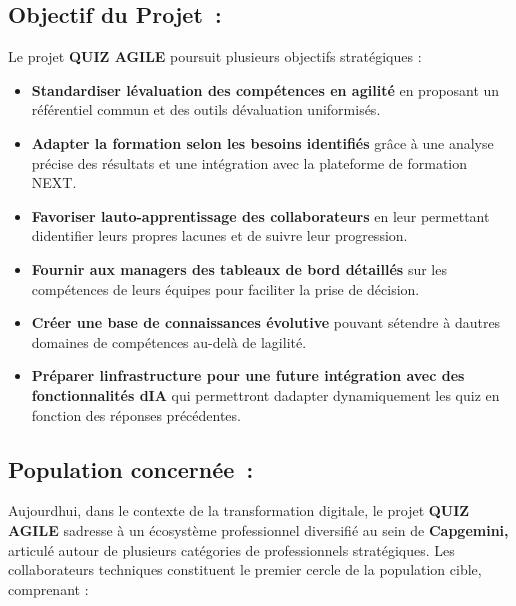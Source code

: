 \documentclass[12pt,a4paper,twoside]{report}
\begin{document}
\hypertarget{objectif-du-projet}{%
\subsection{Objectif du Projet~:~}\label{objectif-du-projet}}

Le projet \textbf{QUIZ AGILE} poursuit plusieurs objectifs stratégiques
:

\begin{itemize}
\item
  \textbf{Standardiser l\textquotesingle évaluation des compétences en
  agilité} en proposant un référentiel commun et des outils
  d\textquotesingle évaluation uniformisés.
\item
  \textbf{Adapter la formation selon les besoins identifiés} grâce à une
  analyse précise des résultats et une intégration avec la plateforme de
  formation NEXT.
\item
  \textbf{Favoriser l\textquotesingle auto-apprentissage des
  collaborateurs} en leur permettant d\textquotesingle identifier leurs
  propres lacunes et de suivre leur progression.
\item
  \textbf{Fournir aux managers des tableaux de bord détaillés} sur les
  compétences de leurs équipes pour faciliter la prise de décision.
\item
  \textbf{Créer une base de connaissances évolutive} pouvant
  s\textquotesingle étendre à d\textquotesingle autres domaines de
  compétences au-delà de l\textquotesingle agilité.
\item
  \textbf{Préparer l\textquotesingle infrastructure pour une future
  intégration avec des fonctionnalités d\textquotesingle IA} qui
  permettront d\textquotesingle adapter dynamiquement les quiz en
  fonction des réponses précédentes.
\end{itemize}

\hypertarget{population-concernuxe9e}{%
\subsection{Population concernée~:}\label{population-concernuxe9e}}

Aujourd\textquotesingle hui, dans le contexte de la transformation
digitale, le projet \textbf{QUIZ AGILE} s\textquotesingle adresse à un
écosystème professionnel diversifié au sein de \textbf{Capgemini,}
articulé autour de plusieurs catégories de professionnels stratégiques.
Les collaborateurs techniques constituent le premier cercle de la
population cible, comprenant :
\end{document}
